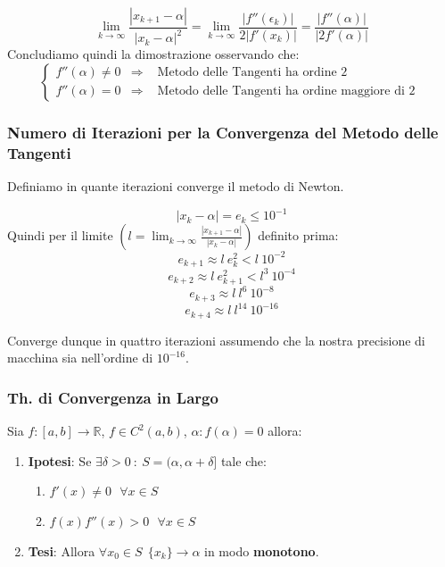 \documentclass{article}
\begin{document}
\begin{enumerate}
\begin{enumerate}
        \[ \lim_{k \rightarrow \infty} \frac{|x_{k+1} - \alpha|}{|x_{k} - \alpha|^{2}} = \lim_{k \rightarrow \infty} \frac{|f''(\epsilon_{k})|}{2|f'(x_{k})|} = \frac{|f''(\alpha)|}{|2f'(\alpha)|} \]
        Concludiamo quindi la dimostrazione osservando che: 
        \[
        \left\{
        \begin{array}{lll}
            f''(\alpha) \neq 0 & \Rightarrow & \text{ Metodo delle Tangenti ha ordine 2 } \\
            f''(\alpha) = 0 & \Rightarrow & \text{ Metodo delle Tangenti ha ordine maggiore di 2 } 
        \end{array}
        \right.
        \]
    \end{enumerate}
\end{enumerate}

\subsubsection{Numero di Iterazioni per la Convergenza del Metodo delle Tangenti}

Definiamo in quante iterazioni converge il metodo di Newton.

\[ |x_{k} - \alpha | = e_{k} \leq 10^{-1} \]
Quindi per il limite $(l = \lim_{k \rightarrow \infty } \frac{|x_{k+1} - \alpha|}{|x_{k} - \alpha|})$ definito prima:
\[ e_{k+1} \approx l \: e^{2}_{k} < l \: 10^{-2} \]
\[ e_{k+2} \approx l \: e^{2}_{k+1} < l^{3} \: 10^{-4} \]
\[ e_{k+3} \approx l\:l^{6} \: 10^{-8} \]
\[ e_{k+4} \approx l\:l^{14} \: 10^{-16} \]

Converge dunque in quattro iterazioni assumendo che la nostra precisione di macchina sia nell'ordine di $10^{-16}$.

\subsubsection{Th. di Convergenza in Largo}

Sia $f:[a,b] \rightarrow \mathbb{R}$, $f \in C^{2}(a,b)$, $\alpha : f(\alpha) = 0$ allora:

\begin{enumerate}
    \item \textbf{Ipotesi}: Se $\exists \delta > 0 \::\: S = (\alpha, \alpha + \delta]$ tale che:
    \begin{enumerate}
        \item $f'(x) \neq 0 \:\:\: \forall x \in S$
        \item $f(x)f''(x) > 0\:\:\: \forall x \in S$
    \end{enumerate}
    \item \textbf{Tesi}: Allora $\forall x_{0} \in S \:\: \{ x_{k} \} \rightarrow \alpha$ in modo \textbf{monotono}.
\end{enumerate}
\end{document}
